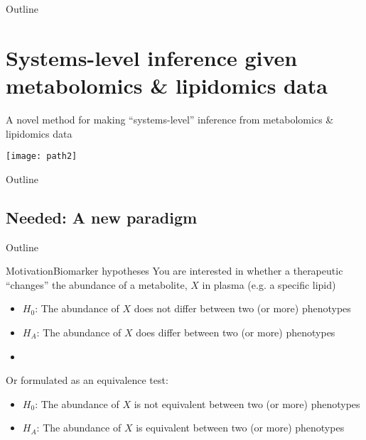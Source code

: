 \documentclass[xcolor=dvipsnames]{beamer}
\begin{document}
\begin{frame}{Outline}
\vspace{-10.5pt}
\tableofcontents[subsectionstyle=hide]
\addtocounter{framenumber}{-1}
\end{frame}

\section{Systems-level inference given metabolomics \& lipidomics data}

\begin{frame}{A novel method for making ``systems-level'' inference from metabolomics \& lipidomics data}
\vspace{-15pt}
\begin{center}
	\texttt{[image: path2]}
\end{center}
\end{frame}

\begin{frame}{Outline}
\vspace{-10.5pt}
\tableofcontents[currentsection,subsectionstyle=show/show/hide]
\addtocounter{framenumber}{-1}
\end{frame}

\subsection{Needed: A new paradigm}
\begin{frame}{Outline}
\vspace{-10.5pt}
\tableofcontents[currentsection,subsectionstyle=show/shaded/hide]
\addtocounter{framenumber}{-1}
\end{frame}

\begin{frame}{Motivation}{Biomarker hypotheses}
	\vspace{-10pt}
	You are interested in whether a therapeutic ``changes'' the abundance of a metabolite, $X$ in plasma (e.g. a specific lipid) \pause
	\begin{itemize}
		\item $H_0$: The abundance of $X$ does not differ between two (or more) phenotypes \pause
		\item $H_A$: The abundance of $X$ does differ between two (or more) phenotypes 
		\item[]
	\end{itemize} \pause
	
	Or formulated as an equivalence test:
	\begin{itemize}
		\item $H_0$: The abundance of $X$ is not equivalent between two (or more) phenotypes  
		\item $H_A$: The abundance of $X$ is equivalent between two (or more) phenotypes  
	\end{itemize}
\end{frame}
\end{document}
